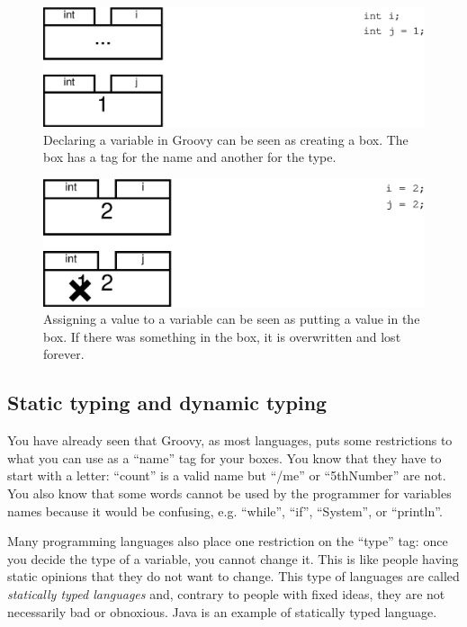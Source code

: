 \begin{figure}
  \centering
  \includegraphics[width=\textwidth]{gfx/variables1}
  \caption{Declaring a variable in Groovy can be seen as creating a
    box. The box has a tag for the name and another for the type.}
  \label{fig:var1}
\end{figure}

\begin{figure}
  \centering
  \includegraphics[width=\textwidth]{gfx/variables2}
  \caption{Assigning a value to a variable can be seen as putting a
    value in the box. If there was something in the box, it is
    overwritten and lost forever.}
  \label{fig:var2}
\end{figure}

\subsection{Static typing and dynamic typing}
\label{sec:strong-typing-weak}

You have already seen that Groovy, as most languages, puts some
restrictions to what you can use as a ``name'' tag for your boxes. You
know that they have to start with a letter: ``count'' is a valid name
but ``/me'' or ``5thNumber'' are not. You also know that some words
cannot be used by the programmer for variables names because it would
be confusing, e.g. ``while'', ``if'', ``System'', or ``println''.

Many programming languages also place one restriction on the ``type''
tag: once you decide the type of a variable, you cannot change
it. This is like people having static opinions that they do not want
to change. This type of languages are called \emph{statically typed
  languages} and, contrary to people with fixed ideas, they are
not necessarily bad or obnoxious. Java is an example of
statically typed language. 

